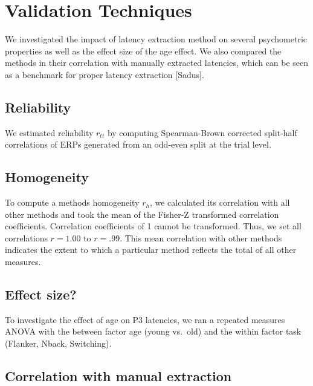 \documentclass[
  man,floatsintext]{apa7}
\begin{document}
\hypertarget{validation-techniques}{%
\section{Validation Techniques}\label{validation-techniques}}

We investigated the impact of latency extraction method on several psychometric properties as well as the effect size of the age effect. We also compared the methods in their correlation with manually extracted latencies, which can be seen as a benchmark for proper latency extraction {[}Sadus{]}.

\hypertarget{reliability}{%
\subsection{Reliability}\label{reliability}}

We estimated reliability \(r_{tt}\) by computing Spearman-Brown corrected split-half correlations of ERPs generated from an odd-even split at the trial level.

\hypertarget{homogeneity}{%
\subsection{Homogeneity}\label{homogeneity}}

To compute a methods homogeneity \(r_h\), we calculated its correlation with all other methods and took the mean of the Fisher-Z transformed correlation coefficients. Correlation coefficients of 1 cannot be transformed. Thus, we set all correlations \(r = 1.00\) to \(r = .99\). This mean correlation with other methods indicates the extent to which a particular method reflects the total of all other measures.

\hypertarget{effect-size}{%
\subsection{Effect size?}\label{effect-size}}

To investigate the effect of age on P3 latencies, we ran a repeated measures ANOVA with the between factor age (young vs.~old) and the within factor task (Flanker, Nback, Switching).

\hypertarget{correlation-with-manual-extraction}{%
\subsection{Correlation with manual extraction}\label{correlation-with-manual-extraction}}
\end{document}
